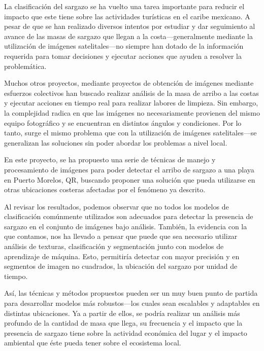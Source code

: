 \documentclass[conference]{IEEEtran}
\begin{document}
La clasificación del sargazo se ha vuelto una tarea importante para reducir el impacto que este tiene sobre las actividades turísticas en el caribe mexicano. A pesar de que se han realizado diversos intentos por estudiar y dar seguimiento al avance de las masas de sargazo que llegan a la costa---generalmente mediante la utilización de imágenes satelitales---no siempre han dotado de la información requerida para tomar decisiones y ejecutar acciones que ayuden a resolver la problemática.

Muchos otros proyectos, mediante proyectos de obtención de imágenes mediante esfuerzos colectivos han buscado realizar análisis de la masa de arribo a las costas y ejecutar acciones en tiempo real para realizar labores de limpieza. Sin embargo, la complejidad radica en que las imágenes no necesariamente provienen del mismo equipo fotográfico y se encuentran en distintos ángulos y condiciones. Por lo tanto, surge el mismo problema que con la utilización de imágenes satelitales---se generalizan las soluciones sin poder abordar los problemas a nivel local.

En este proyecto, se ha propuesto una serie de técnicas de manejo y procesamiento de imágenes para poder detectar el arribo de sargazo a una playa en Puerto Morelos, QR, buscando proponer una solución que pueda utilizarse en otras ubicaciones costeras afectadas por el fenómeno ya descrito.

Al revisar los resultados, podemos observar que no todos los modelos de clasificación comúnmente utilizados son adecuados para detectar la presencia de sargazo en el conjunto de imágenes bajo análisis. También, la evidencia con la que contamos, nos ha llevado a pensar que puede que sea necesario utilizar análisis de texturas, clasificación y segmentación junto con modelos de aprendizaje de máquina. Esto, permitiría detectar con mayor precisión y en segmentos de imagen no cuadrados, la ubicación del sargazo por unidad de tiempo.

Así, las técnicas y métodos propuestos pueden ser un muy buen punto de partida para desarrollar modelos más robustos---los cuales sean escalables y adaptables en distintas ubicaciones. Ya a partir de ellos, se podría realizar un análisis más profundo de la cantidad de masa que llega, su frecuencia y el impacto que la presencia de sargazo tiene sobre la actividad económica del lugar y el impacto ambiental que éste pueda tener sobre el ecosistema local.

\end{document}
